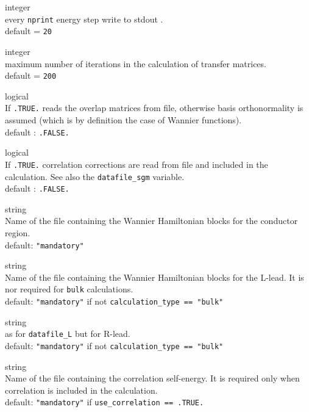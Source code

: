 {\noindent{}%
{\sc integer} \\ every {\tt nprint} energy step write to stdout .\\
{\sc default} = {\tt 20} \par

\noindent{}%
{\sc integer} \\ maximum number of iterations in the calculation of transfer
                 matrices. \\
{\sc default} = { \tt 200} \par

\noindent{}%
{\sc logical} \\ If {\tt .TRUE.} reads the overlap matrices from file,
otherwise basis orthonormality
            is assumed (which is by definition the case of Wannier functions). \\
            {\sc default} : {\tt .FALSE.} \par

\noindent{}%
{\sc logical} \\ If {\tt .TRUE.} correlation corrections are read from file and included
            in the calculation. See also the {\tt datafile\_sgm} variable. \\
            {\sc default} : {\tt .FALSE.} \par

\noindent{}%
{\sc string} \\ Name of the file containing the Wannier Hamiltonian blocks for the
            conductor region. \\
            {\sc default}: {\tt "mandatory"} \par

\noindent{}%
{\sc string} \\ Name of the file containing the Wannier Hamiltonian blocks for the
            L-lead. It is nor required for {\tt bulk} calculations. \\
            {\sc default}: {\tt "mandatory"} if not {\tt calculation\_type == "bulk"} \par

\noindent{}%
{\sc string} \\ as for {\tt datafile\_L} but for R-lead. \\
            {\sc default}: {\tt "mandatory"} if not {\tt calculation\_type == "bulk"} \par

\noindent{}%
{\sc string} \\ Name of the file containing the correlation self-energy. It is required only
            when correlation is included in the calculation. \\
            {\sc default}: {\tt "mandatory"} if {\tt use\_correlation == .TRUE.} \par
\bigskip
}

